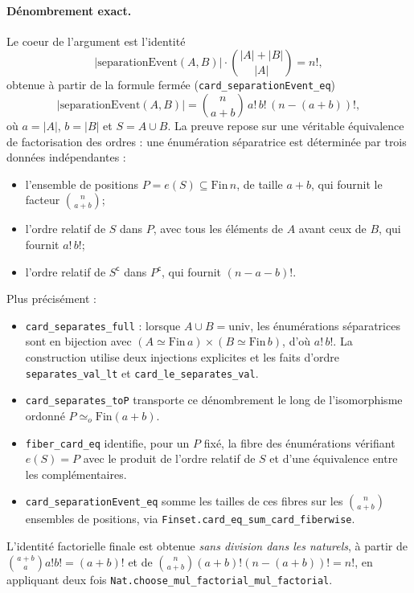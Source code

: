 \documentclass[11pt]{article}
\newcommand{\bind}[2]{\binom{#1}{#2}}
\begin{document}
\paragraph{Dénombrement exact.} Le coeur de l'argument est l'identité
\[ |\mathrm{separationEvent}(A,B)|\cdot\bind{|A|+|B|}{|A|}=n!, \]
obtenue à partir de la formule fermée
(\lstinline{card_separationEvent_eq})
\[ |\mathrm{separationEvent}(A,B)|=\bind{n}{a+b}\,a!\,b!\,(n-(a{+}b))!, \]
où $a=|A|$, $b=|B|$ et $S=A\cup B$. La preuve repose sur une véritable équivalence de
factorisation des ordres : une énumération séparatrice est déterminée par trois données
indépendantes :
\begin{itemize}
\item l'ensemble de positions $P=e(S)\subseteq\mathrm{Fin}\,n$, de taille $a+b$, qui
  fournit le facteur $\bind{n}{a+b}$;
\item l'ordre relatif de $S$ dans $P$, avec tous les éléments de $A$ avant ceux de $B$,
  qui fournit $a!\,b!$;
\item l'ordre relatif de $S^{\mathsf c}$ dans $P^{\mathsf c}$, qui fournit
  $(n-a-b)!$.
\end{itemize}
Plus précisément :
\begin{itemize}
\item \lstinline{card_separates_full} : lorsque $A\cup B=\mathrm{univ}$, les
  énumérations séparatrices sont en bijection avec
  $(A\simeq\mathrm{Fin}\,a)\times(B\simeq\mathrm{Fin}\,b)$, d'où $a!\,b!$. La
  construction utilise deux injections explicites et les faits d'ordre
  \lstinline{separates_val_lt} et \lstinline{card_le_separates_val}.
\item \lstinline{card_separates_toP} transporte ce dénombrement le long de
  l'isomorphisme ordonné $P\simeq_o\mathrm{Fin}(a+b)$.
\item \lstinline{fiber_card_eq} identifie, pour un $P$ fixé, la fibre des énumérations
  vérifiant $e(S)=P$ avec le produit de l'ordre relatif de $S$ et d'une équivalence entre
  les complémentaires.
\item \lstinline{card_separationEvent_eq} somme les tailles de ces fibres sur les
  $\bind{n}{a+b}$ ensembles de positions, via
  \lstinline{Finset.card_eq_sum_card_fiberwise}.
\end{itemize}
L'identité factorielle finale est obtenue \emph{sans division dans les naturels}, à
partir de $\bind{a+b}{a}a!b!=(a+b)!$ et de
$\bind{n}{a+b}(a+b)!(n-(a+b))!=n!$, en appliquant deux fois
\lstinline{Nat.choose_mul_factorial_mul_factorial}.
\end{document}
